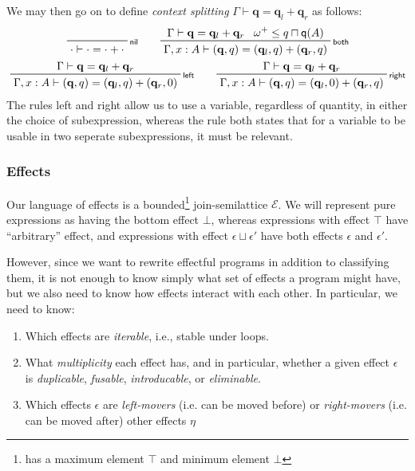 \documentclass[acmsmall,screen,review]{acmart}
\newcommand{\mc}[1]{\ensuremath{\mathcal{#1}}}
\newcommand{\mb}[1]{\ensuremath{\mathbf{#1}}}
\newcommand{\ms}[1]{\ensuremath{\mathsf{#1}}}
\newcommand{\qsp}[4]{#1 \vdash #2 = #3 + #4}
\newcommand{\rle}[1]{{\scriptsize\textsf{#1}}}
\newcommand{\brle}[1]{{\textsf{#1}}}
\newcommand{\zeroq}{0}
\newcommand{\cpyq}{\omega^+}
\newcommand{\alquant}{\ms{q}}
\begin{document}
We may then go on to define \emph{context splitting} $\qsp{\Gamma}{\mb{q}}{\mb{q}_l}{\mb{q}_r}$ as
follows:
\begin{gather*}
  \prftree[r]{\rle{nil}}
    {\qsp{\cdot}{\cdot}{\cdot}{\cdot}} \qquad
  \prftree[r]{\rle{both}}
    {\qsp{\Gamma}{\mb{q}}{\mb{q}_l}{\mb{q}_r}}
    {\cpyq \leq q \sqcap \alquant(A)}
    {\qsp{\Gamma, x : A}{(\mb{q}, q)}{(\mb{q}_l, q)}{(\mb{q}_r, q)}}
    \\
  \prftree[r]{\rle{left}}
    {\qsp{\Gamma}{\mb{q}}{\mb{q}_l}{\mb{q}_r}}
    {\qsp{\Gamma, x : A}{(\mb{q}, q)}{(\mb{q}_l, q)}{(\mb{q}_r, \zeroq)}} \qquad
  \prftree[r]{\rle{right}}
    {\qsp{\Gamma}{\mb{q}}{\mb{q}_l}{\mb{q}_r}}
    {\qsp{\Gamma, x : A}{(\mb{q}, q)}{(\mb{q}_l, \zeroq)}{(\mb{q}_r, q)}}
\end{gather*}
The rules \brle{left} and \brle{right} allow us to use a variable, regardless of quantity, in either
the choice of subexpression, whereas the rule \brle{both} states that for a variable to be usable in
two seperate subexpressions, it must be relevant.

\subsubsection{Effects}
Our language of effects is a bounded\footnote{has a maximum element $\top$ and minimum element
$\bot$} join-semilattice $\mc{E}$. We will represent pure expressions as having the bottom effect
$\bot$, whereas expressions with effect $\top$ have ``arbitrary'' effect, and expressions with
effect $\epsilon \sqcup \epsilon'$ have both effects $\epsilon$ and $\epsilon'$.

However, since we want to rewrite effectful programs in addition to classifying them, it is not
enough to know simply what set of effects a program might have, but we also need to know how effects
interact with each other. In particular, we need to know:
\begin{enumerate}
  \item Which effects are \emph{iterable}, i.e., stable under loops. 
  \item What \emph{multiplicity} each effect has, and in particular, whether a given effect
  $\epsilon$ is \emph{duplicable}, \emph{fusable}, \emph{introducable}, or \emph{eliminable}.
  \item Which effects $\epsilon$ are \emph{left-movers} (i.e. can be moved before) or
  \emph{right-movers} (i.e. can be moved after) other effects $\eta$
\end{enumerate}
\end{document}
